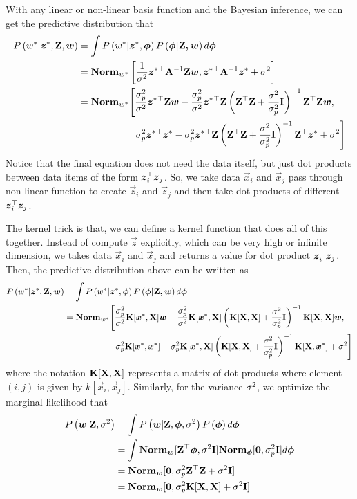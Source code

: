 With any linear or non-linear basis function and the Bayesian inference, we can get the predictive distribution that
\begin{align*}
	P\left(w^*|\boldsymbol{z}^*,\mathbf{Z},\boldsymbol{w}\right)&=\int P\left(w^*|\boldsymbol{z}^*,\boldsymbol{\phi}\right)P\left(\boldsymbol{\phi|\mathbf{Z},\boldsymbol{w}}\right)d\boldsymbol{\phi} \\
	&=\mathbf{Norm}_{w^*}\left[\frac{1}{\sigma^2}\boldsymbol{z}^*{}^\top\mathbf{A}^{-1}\mathbf{Z}\boldsymbol{w},\boldsymbol{z}^*{}^\top\mathbf{A}^{-1}\boldsymbol{z}^*+\sigma^2\right] \\
	&=\mathbf{Norm}_{w^*}\Bigg[\frac{\sigma_p^2}{\sigma^2}\boldsymbol{z}^*{}^\top\mathbf{Z}\boldsymbol{w}-\frac{\sigma_p^2}{\sigma^2}\boldsymbol{z}^*{}^\top\mathbf{Z}\left(\mathbf{Z}^\top\mathbf{Z}+\frac{\sigma^2}{\sigma_p^2}\mathbf{I}\right)^{-1}\mathbf{Z}^\top\mathbf{Z}\boldsymbol{w},\\
	&\qquad\qquad\qquad\sigma_p^2\boldsymbol{z}^*{}^\top\boldsymbol{z}^*-\sigma_p^2\boldsymbol{z}^*{}^\top\mathbf{Z}\left(\mathbf{Z}^\top\mathbf{Z}+\frac{\sigma^2}{\sigma_p^2}\mathbf{I}\right)^{-1}\mathbf{Z}^\top\boldsymbol{z}^*+\sigma^2\Bigg]
\end{align*}
Notice that the final equation does not need the data itself, but just dot products between data items of the form $\boldsymbol{z}_i^\top\boldsymbol{z}_j$. So, we take data $\vec{x}_i$ and $\vec{x}_j$ pass through non-linear function to create $\vec{z}_i$ and $\vec{z}_j$ and then take dot products of different $\boldsymbol{z}_i^\top\boldsymbol{z}_j$.

The kernel trick is that, we can define a kernel function that does all of this together. Instead of compute $\vec{z}$ explicitly, which can be very high or infinite dimension, we takes data $\vec{x}_i$ and $\vec{x}_j$ and returns a value for dot product $\boldsymbol{z}_i^\top\boldsymbol{z}_j$. Then, the predictive distribution above can be written as
\begin{align*}
	P\left(w^*|\boldsymbol{z}^*,\mathbf{Z},\boldsymbol{w}\right)&=\int P\left(w^*|\boldsymbol{z}^*,\boldsymbol{\phi}\right)P\left(\boldsymbol{\phi|\mathbf{Z},\boldsymbol{w}}\right)d\boldsymbol{\phi} \\
	&=\mathbf{Norm}_{w^*}\Bigg[\frac{\sigma_p^2}{\sigma^2}\mathbf{K}[\boldsymbol{x}^*,\mathbf{X}]\boldsymbol{w}-\frac{\sigma_p^2}{\sigma^2}\mathbf{K}[\boldsymbol{x}^*,\mathbf{X}]\left(\mathbf{K}[\mathbf{X},\mathbf{X}]+\frac{\sigma^2}{\sigma_p^2}\mathbf{I}\right)^{-1}\mathbf{K}[\mathbf{X},\mathbf{X}]\boldsymbol{w},\\
	&\qquad\qquad\qquad\sigma_p^2\mathbf{K}[\boldsymbol{x}^*,\boldsymbol{x}^*]-\sigma_p^2\mathbf{K}[\boldsymbol{x}^*,\mathbf{X}]\left(\mathbf{K}[\mathbf{X},\mathbf{X}]+\frac{\sigma^2}{\sigma_p^2}\mathbf{I}\right)^{-1}\mathbf{K}[\mathbf{X},\boldsymbol{x}^*]+\sigma^2\Bigg]
\end{align*}
where the notation $\mathbf{K}[\mathbf{X},\mathbf{X}]$ represents a matrix of dot products where element $(i,j)$ is given by $k[\vec{x}_i,\vec{x}_j]$. Similarly, for the variance $\sigma^2$, we optimize the marginal likelihood that
\begin{align*}
P\left(\boldsymbol{w}|\mathbf{Z},\sigma^2\right)&=\int P\left(\boldsymbol{w}|\mathbf{Z},\boldsymbol{\phi},\sigma^2\right)P\left(\boldsymbol{\phi}\right)d\boldsymbol{\phi} \\
&=\int\mathbf{Norm}_{\boldsymbol{w}}[\mathbf{Z}{}^\top\boldsymbol{\phi},\sigma^2\mathbf{I}]\mathbf{Norm}_{\boldsymbol{\phi}}[\boldsymbol{0},\sigma_p^2\mathbf{I}]d\boldsymbol{\phi} \\
&=\mathbf{Norm}_{\boldsymbol{w}}[\boldsymbol{0},\sigma_p^2\mathbf{Z}{}^\top\mathbf{Z}+\sigma^2\mathbf{I}] \\
&=\mathbf{Norm}_{\boldsymbol{w}}[\boldsymbol{0},\sigma_p^2\mathbf{K}[\mathbf{X},\mathbf{X}]+\sigma^2\mathbf{I}]
\end{align*}


